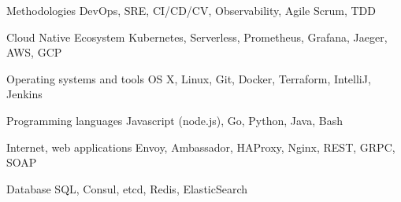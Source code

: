 
\begin{cvskills}

  \cvskill
    {Methodologies} %
    {DevOps, SRE, CI/CD/CV, Observability, Agile Scrum, TDD} %

  \cvskill
    {Cloud Native Ecosystem} %
    {Kubernetes, Serverless, Prometheus, Grafana, Jaeger, AWS, GCP} %

  \cvskill
    {Operating systems and tools} %
    {OS X, Linux, Git, Docker, Terraform, IntelliJ, Jenkins} %

  \cvskill
    {Programming languages} %
    {Javascript (node.js), Go, Python, Java, Bash} %

  \cvskill
    {Internet, web applications} %
    {Envoy, Ambassador, HAProxy, Nginx, REST, GRPC, SOAP} %

  \cvskill
    {Database} %
    {SQL, Consul, etcd, Redis, ElasticSearch} %

\end{cvskills}